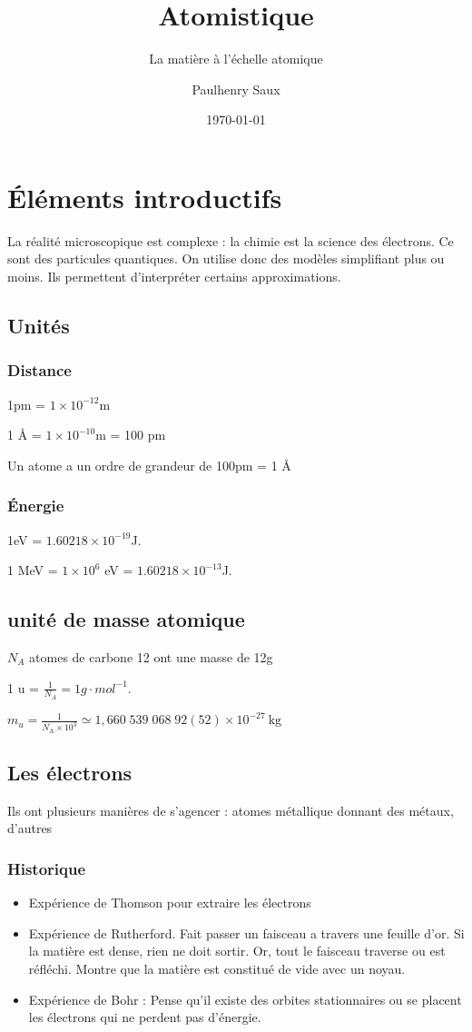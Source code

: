 \documentclass[french]{yLectureNote}
\title{Atomistique}
\subtitle{La matière à l'échelle atomique}
\author{Paulhenry Saux}
\date{\today}
\begin{document}
\titleOne

	\chapter{Éléments introductifs }

La réalité microscopique est complexe : la chimie est la science des électrons. Ce sont des particules quantiques. On utilise donc des modèles simplifiant plus ou moins. Ils permettent d'interpréter certains approximations.

\section{Unités}
\subsection{Distance}
1pm = $1\times 10^{-12}$m

1 \r{A}  = $1\times 10^{-10}$m = 100 pm

Un atome a un ordre de grandeur de 100pm = 1 \r{A}
\subsection{Énergie}
1eV = $1.60218 \times 10^{-19}$J.

1 MeV = $1\times 10^6$ eV = $1.60218 \times 10^{-13}$J.

\section{unité de masse atomique}

$N_A$ atomes de carbone 12 ont une masse de 12g

1 u = $\frac{1}{N_A} = 1g\cdot mol^{-1}$.

$m_u=\frac1{N_\mathrm A\times10^3}\simeq 1{,}660\;539\;068\;92(52)\times 10^{-27}\ \mbox{kg}$
\section{Les électrons}
Ils ont plusieurs manières de s'agencer : atomes métallique donnant des métaux, d'autres

\subsection{Historique}
\begin{itemize}
 \item Expérience de Thomson pour extraire les électrons
 \item Expérience de Rutherford. Fait passer un faisceau a travers une feuille d'or. Si la matière est dense, rien ne doit sortir. Or, tout le faisceau traverse ou est réfléchi. Montre que la matière est constitué de vide avec un noyau.
 \item Expérience de Bohr : Pense qu'il existe des orbites stationnaires ou se placent les électrons qui ne perdent pas d'énergie.
\end{itemize}
\end{document}
